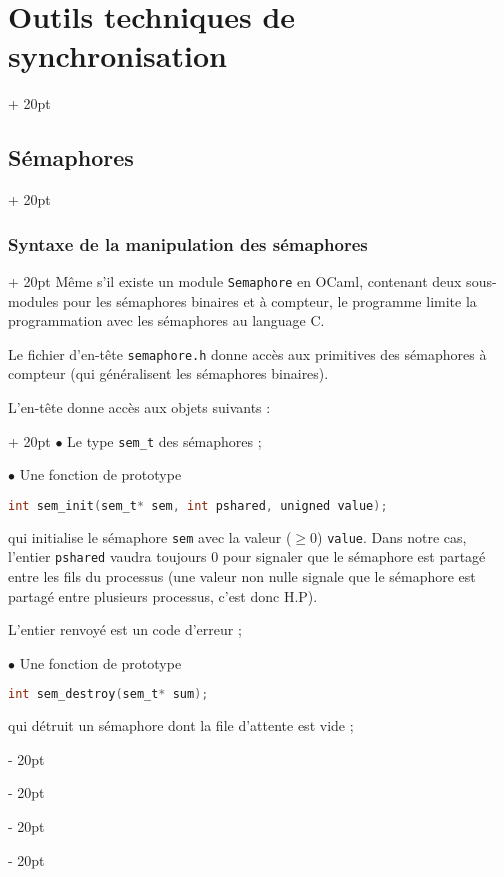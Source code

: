 \documentclass[a4paper, 12pt, twoside]{article}
\renewcommand{\ge}{\geqslant}
\newcommand{\ind}[1][20pt]{\advance\leftskip + #1}
\newcommand{\deind}[1][20pt]{\advance\leftskip - #1}
\newenvironment{indt}[2][20pt]{#2 \par \ind[#1]}{\par \deind} %
\begin{document}
\begin{indt}{\section{Outils techniques de synchronisation}}
\begin{indt}{\subsection{Sémaphores}}
            \vspace{12pt}
            
            \begin{indt}{\subsubsection{Syntaxe de la manipulation  des sémaphores}}
                Même s'il existe un module \texttt{Semaphore} en OCaml, contenant deux sous-modules pour les sémaphores binaires et à compteur, le programme limite la programmation avec les sémaphores au language C.

                Le fichier d'en-tête \texttt{semaphore.h} donne accès aux primitives des sémaphores à compteur (qui généralisent les sémaphores binaires).

                \vspace{12pt}
                
                \begin{indt}{L'en-tête donne accès aux objets suivants :}
                    $\bullet$ Le type \texttt{sem\_t} des sémaphores ;

                    \vspace{6pt}
                    
                    $\bullet$ Une fonction de prototype
                    \begin{lstlisting}[language=C, xleftmargin=100pt]
int sem_init(sem_t* sem, int pshared, unigned value);\end{lstlisting}

                    qui initialise le sémaphore \texttt{sem} avec la valeur ($\ge 0$) \texttt{value}.
                    Dans notre cas, l'entier \texttt{pshared} vaudra toujours 0 pour signaler que le sémaphore est partagé entre les fils du processus (une valeur non nulle signale que le sémaphore est partagé entre plusieurs processus, c'est donc H.P).

                    L'entier renvoyé est un code d'erreur ;

                    \vspace{6pt}
                    
                    $\bullet$ Une fonction de prototype
                    \begin{lstlisting}[language=C, xleftmargin=100pt]
int sem_destroy(sem_t* sum);\end{lstlisting}
                    qui détruit un sémaphore dont la file d'attente est vide ;


\end{indt}
\end{indt}
\end{indt}
\end{indt}
\end{document}
